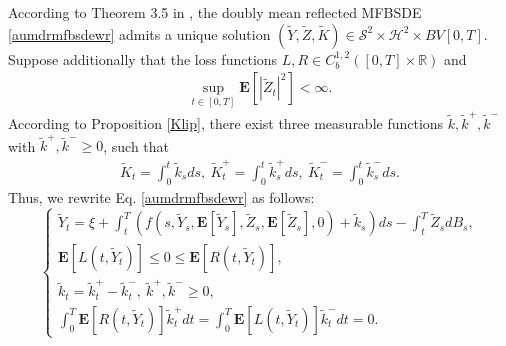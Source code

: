 \documentclass[10pt]{article}%
\numberwithin{equation}{section}
\def \E{\mathbf{E}}
\begin{document}
According to Theorem 3.5 in \cite{LS}, the doubly mean reflected MFBSDE \eqref{aumdrmfbsdewr} admits  a unique solution $(\widetilde{Y},\widetilde{Z},\widetilde{K})\in \mathcal{S}^2 \times \mathcal{H}^2 \times BV[0,T]$. Suppose additionally that the loss functions $L,R\in C^{1,2}_b([0,T]\times\mathbb{R})$ and 
\begin{align}\label{bdd of tilde Z}
    \sup_{t\in[0,T]}\E[|\widetilde{Z}_t|^2]<\infty.
\end{align}
According to Proposition \ref{Klip},  there exist three measurable functions  $\widetilde{k},\widetilde{k}^+,\widetilde{k}^-$ with $\widetilde{k}^+,\widetilde{k}^-\geq0$, such that
\begin{align*}
\widetilde{K}_t=\int_{0}^{t}\widetilde{k}_s ds, \ \widetilde{K}^+_t=\int_{0}^{t}\widetilde{k}^+_s ds, \ \widetilde{K}^-_t=\int_{0}^{t}\widetilde{k}^-_s ds.
\end{align*}
Thus, we rewrite Eq. \eqref{aumdrmfbsdewr} as follows:
\begin{equation}
\begin{cases}
\widetilde{Y}_t=\xi+\int_t^T \left(f(s,\widetilde{Y}_s,\mathbf{E}[\widetilde{Y}_s],\widetilde{Z}_s,\mathbf{E}[\widetilde{Z}_s],0)+\widetilde{k}_s\right)ds-\int_t^T\widetilde{Z}_s dB_s, \\
\mathbf{E}[L(t,\widetilde{Y}_t)]\leq 0\leq \mathbf{E}[R(t,\widetilde{Y}_t)],\\ 
{\widetilde{k}_t=\widetilde{k}^+_t-\widetilde{k}^-_t, \ \widetilde{k}^+,\widetilde{k}^-\geq 0,} \\
\int_0^T \mathbf{E}[R(t,\widetilde{Y}_t)]\widetilde{k}^+_tdt=\int_0^T \mathbf{E}[L(t,\widetilde{Y}_t)]\widetilde{k}^-_tdt=0.
\end{cases}
\end{equation}
\end{document}
